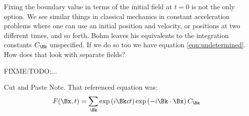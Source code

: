 \documentclass{article}
\begin{document}
Fixing the boundary value in terms of the initial field at $t=0$ is not the only option.  We see similar things in classical mechanics in constant acceleration problems where one can use an initial position and velocity, or positions at two different times, and so forth.  Bohm leaves his equivalents to the integration constants $C_{\Bk}$ unspecified.  If we do so too we have equation \ref{eqn:undetermined}.  How does that look with separate fields?

FIXME:TODO:...  

Cut and Paste Note.  That referenced equation was:
\begin{align}\label{eqn:undetermined}
F(\Bx,t) = \sum_{\Bk} 
\exp\left(i \Bk c t \right) 
\exp\left(-i \Bk \cdot \Bx \right) 
C_{\Bk} 
\end{align}



\end{document}
